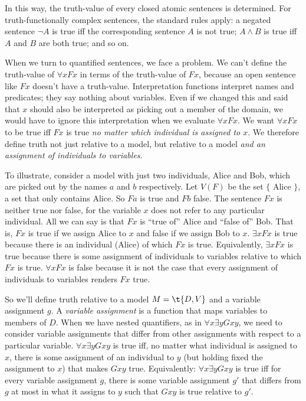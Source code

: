 In this way, the truth-value of every closed atomic sentences is determined. For
truth-functionally complex sentences, the standard rules apply: a negated
sentence $\neg A$ is true iff the corresponding sentence $A$ is not true;
$A \land B$ is true iff $A$ and $B$ are both true; and so on.

When we turn to quantified sentences, we face a problem. We can't define the
truth-value of $\forall x Fx$ in terms of the truth-value of $Fx$, because an
open sentence like $Fx$ doesn't have a truth-value. Interpretation functions
interpret names and predicates; they say nothing about variables. Even if we
changed this and said that $x$ should also be interpreted as picking out a
member of the domain, we would have to ignore this interpretation when we
evaluate $\forall x Fx$. We want $\forall x Fx$ to be true iff $Fx$ is true
\emph{no matter which individual is assigned to $x$}. We therefore define truth
not just relative to a model, but relative to a model \emph{and an assignment of
  individuals to variables}.

To illustrate, consider a model with just two individuals, Alice and Bob, which
are picked out by the names $a$ and $b$ respectively. Let $V(F)$ be the set $\{$
Alice $\}$, a set that only contains Alice. So $Fa$ is true and $Fb$ false. The
sentence $Fx$ is neither true nor false, for the variable $x$ does not refer to
any particular individual. All we can say is that $Fx$ is ``true of'' Alice and
``false of'' Bob. That is, $Fx$ is true if we assign Alice to $x$ and false if
we assign Bob to $x$. $\exists x Fx$ is true because there is an individual
(Alice) of which $Fx$ is true. Equivalently, $\exists x Fx$ is true because
there is some assignment of individuals to variables relative to which $Fx$ is
true. $\forall x Fx$ is false because it is not the case that every assignment
of individuals to variables renders $Fx$ true.

So we'll define truth relative to a model $M = \t{D,V}$ and a variable
assignment $g$. A \emph{variable assignment} is a function that maps variables
to members of $D$. When we have nested quantifiers, as in
$\forall x \exists y Gxy$, we need to consider variable assignments that differ
from other assignments with respect to a particular variable.
$\forall x \exists y Gxy$ is true iff, no matter what individual is assigned to
$x$, there is some assignment of an individual to $y$ (but holding fixed the
assignment to $x$) that makes $Gxy$ true. Equivalently: $\forall x\exists y Gxy$
is true iff for every variable assignment $g$, there is some variable assignment
$g'$ that differs from $g$ at most in what it assigns to $y$ such that $Gxy$ is
true relative to $g'$.

